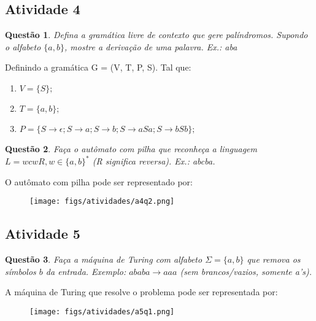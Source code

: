 \documentclass{article}
\newtheorem{problem}{Questão}
\begin{document}
\subsection{Atividade 4}
\begin{problem} Defina a gramática livre de contexto que gere palíndromos. Supondo o alfabeto $\{a,b\}$, mostre a derivação de uma palavra. Ex.: aba
\end{problem}

\begin{solution}
 Definindo a gramática G = (V, T, P, S). Tal que:
 
\begin{enumerate}[label=]
    \item $V = \{S\};$
    \item $T = \{a, b\};$
    \item $P = \{S \rightarrow \epsilon; S \rightarrow a; S \rightarrow  b; S \rightarrow aSa; S \rightarrow bSb\};$
\end{enumerate}

\end{solution}
\begin{problem} Faça o autômato com pilha que reconheça a linguagem $L=wcwR, w \in \{a,b\}^{*}$ (R significa reversa). Ex.: abcba.
\end{problem}
\begin{solution}
O autômato com pilha pode ser representado por:
\begin{figure}[H]
        \centering
        \texttt{[image: figs/atividades/a4q2.png]}
\end{figure}


\end{solution}

\subsection{Atividade 5} 
\begin{problem} Faça a máquina de Turing com alfabeto $\Sigma =\{a,b\}$ que remova os símbolos $b$ da entrada. Exemplo:
$ababa \rightarrow aaa$ (sem brancos/vazios, somente a's).
\end{problem}
\begin{solution} A máquina de Turing que resolve o problema pode ser representada por:
\begin{figure}[H]
        \centering
        \texttt{[image: figs/atividades/a5q1.png]}
\end{figure}

\end{solution}
\end{document}
